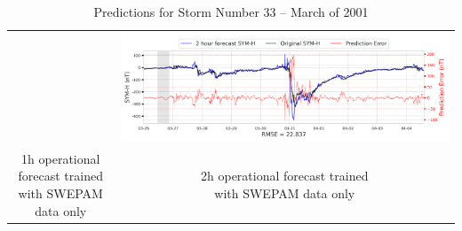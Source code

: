 \documentclass[draft,sw]{agutexSI2019}
\begin{document}
\begin{table}
\begin{tabular}{cc}
&
\includegraphics[width=0.49\linewidth]{paper_plots_shade/2h_swepam_rt/2h_swepam_rt_storm_33.png}
\\
\shortstack{1h operational forecast trained\\ with SWEPAM data only} & \shortstack{2h operational forecast trained\\ with SWEPAM data only}
\vspace*{12pt}
\\
\end{tabular}
\caption{Predictions for Storm Number 33 -- March of 2001}
\label{storm-33}
\end{table}
\end{document}
